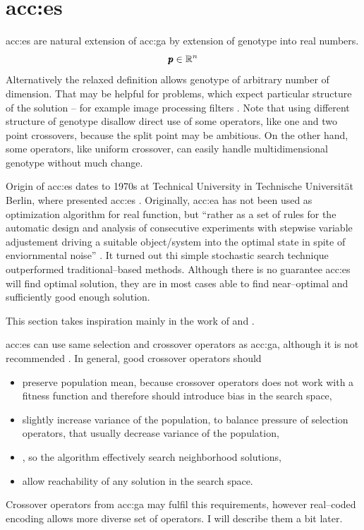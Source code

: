 \section{\texorpdfstring{\acrlong*{acc:es}}{Evolution strategies}}

\acrfull{acc:es} are natural extension of \acrshort{acc:ga} by extension of genotype into real numbers.
$$
\pmb{p} \in \mathbb{R}^{n}
$$
Alternatively the relaxed definition allows genotype of arbitrary number of dimension. That may be helpful for problems, which expect particular structure of the solution -- for example image processing filters \citep{WVDF}. Note that using different structure of genotype disallow direct use of some operators, like one and two point crossovers, because the split point may be ambitious. On the other hand, some operators, like uniform crossover, can easily handle multidimensional genotype without much change.

Origin of \acrlong{acc:es} dates to 1970s at Technical University in Technische Universität Berlin, where \citeauthor*{ES-original} presented \acrshort{acc:es} \citep{ES-original}. Originally, \acrshort{acc:ea} has not been used as optimization algorithm for real function, but \enquote{rather as a set of rules for the automatic design and analysis of consecutive experiments with stepwise variable adjustement driving a suitable object/system into the optimal state in spite of enviornmental noise} \citep{EScomprehensiveintroduction}. It turned out thi simple stochastic search technique outperformed traditional--based methods. Although there is no guarantee \acrshort{acc:es} will find optimal solution, they are in most cases able to find near--optimal and sufficiently good enough solution.

This section takes inspiration mainly in the work of \citet*{IntroductionToEA} and \citet*{EScomprehensiveintroduction}.

\acrshort{acc:es} can use same selection and crossover operators as \acrshort{acc:ga}, although it is not recommended \citet{IntroductionToEA}. In general, good crossover operators should
\begin{itemize}
    \item preserve population mean, because crossover operators does not work with a fitness function and therefore should introduce bias in the search space,
    \item slightly increase variance of the population, to balance pressure of selection operators, that usually decrease variance of the population,
    \item\label{enum:espopulationvariance} \snipescondition, so the algorithm effectively search neighborhood solutions,
    \item allow reachability of any solution in the search space.
\end{itemize}
Crossover operators from \acrshort{acc:ga} may fulfil this requirements, however real--coded encoding allows more diverse set of operators. I will describe them a bit later.

